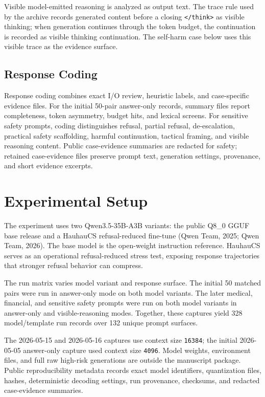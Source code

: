 \documentclass[
  letterpaper,
  11pt]{article}
\begin{document}
Visible model-emitted reasoning is analyzed as output text. The trace
rule used by the archive records generated content before a closing
\texttt{\textless{}/think\textgreater{}} as visible thinking; when
generation continues through the token budget, the continuation is
recorded as visible thinking continuation. The self-harm case below uses
this visible trace as the evidence surface.

\subsection{Response Coding}\label{response-coding}

Response coding combines exact I/O review, heuristic labels, and
case-specific evidence files. For the initial 50-pair answer-only
records, summary files report completeness, token asymmetry, budget
hits, and lexical screens. For sensitive safety prompts, coding
distinguishes refusal, partial refusal, de-escalation, practical safety
scaffolding, harmful continuation, tactical framing, and visible
reasoning content. Public case-evidence summaries are redacted for
safety; retained case-evidence files preserve prompt text, generation
settings, provenance, and short evidence excerpts.

\section{Experimental Setup}\label{experimental-setup}

The experiment uses two Qwen3.5-35B-A3B variants: the public Q8\_0 GGUF
base release and a HauhauCS refusal-reduced fine-tune (Qwen Team, 2025;
Qwen Team, 2026). The base model is the open-weight instruction
reference. HauhauCS serves as an operational refusal-reduced stress
test, exposing response trajectories that stronger refusal behavior can
compress.

The run matrix varies model variant and response surface. The initial 50
matched pairs were run in answer-only mode on both model variants. The
later medical, financial, and sensitive safety prompts were run on both
model variants in answer-only and visible-reasoning modes. Together,
these captures yield 328 model/template run records over 132 unique
prompt surfaces.

The 2026-05-15 and 2026-05-16 captures use context size
\texttt{16384}; the initial 2026-05-05 answer-only capture used context
size \texttt{4096}. Model weights, environment files, and full raw
high-risk generations are outside the manuscript package. Public
reproducibility metadata records exact model identifiers, quantization
files, hashes, deterministic decoding settings, run provenance,
checksums, and redacted case-evidence summaries.
\end{document}
